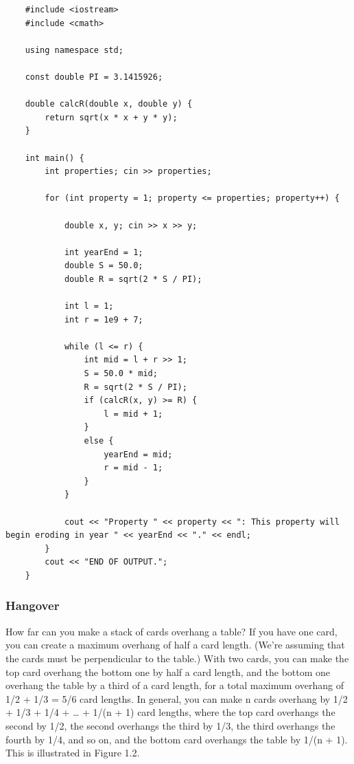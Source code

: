 \documentclass{article}
\begin{document}
\begin{lstlisting}
	#include <iostream>
	#include <cmath>
	
	using namespace std;
	
	const double PI = 3.1415926;
	
	double calcR(double x, double y) {
		return sqrt(x * x + y * y);
	}
	
	int main() {
		int properties; cin >> properties;
	
		for (int property = 1; property <= properties; property++) {
			
			double x, y; cin >> x >> y;
	
			int yearEnd = 1;
			double S = 50.0;
			double R = sqrt(2 * S / PI);
	
			int l = 1;
			int r = 1e9 + 7;
	
			while (l <= r) {
				int mid = l + r >> 1;
				S = 50.0 * mid;
				R = sqrt(2 * S / PI);
				if (calcR(x, y) >= R) {
					l = mid + 1;
				}
				else {
					yearEnd = mid;
					r = mid - 1;
				}
			}
	
			cout << "Property " << property << ": This property will begin eroding in year " << yearEnd << "." << endl;
		}
		cout << "END OF OUTPUT.";
	}
\end{lstlisting}





\subsubsection{Hangover}

How far can you make a stack of cards overhang a table? If you have one card, you can create a
maximum overhang of half a card length. (We’re assuming that the cards must be perpendicular to the table.) With two cards, you can make the top card overhang the bottom one by half a
card length, and the bottom one overhang the table by a third of a card length, for a total maximum overhang of 1/2 + 1/3 = 5/6 card lengths. In general, you can make n cards overhang by
1/2 + 1/3 + 1/4 + … + 1/(n + 1) card lengths, where the top card overhangs the second by 1/2, the
second overhangs the third by 1/3, the third overhangs the fourth by 1/4, and so on, and the bottom card overhangs the table by 1/(n + 1). This is illustrated in Figure 1.2.
\end{document}
